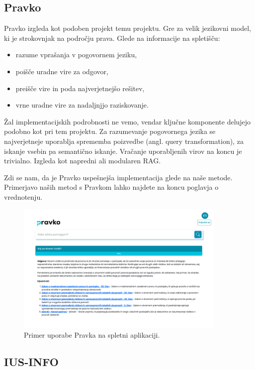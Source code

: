 \documentclass[a4paper,12pt,openright]{book}
\begin{document}
\subsection{Pravko}

Pravko \cite{pravko} izgleda kot podoben projekt temu projektu. Gre za velik jezikovni model, ki je strokovnjak na področju prava. Glede na informacije na spletišču:

\begin{itemize}
    \item razume vprašanja v pogovornem jeziku,
    \item poišče uradne vire za odgovor,
    \item preišče vire in poda najverjetnejšo rešitev,
    \item vrne uradne vire za nadaljnjjo raziskovanje.
\end{itemize}

Žal implementacijskih podrobnosti ne vemo, vendar ključne komponente delujejo podobno kot pri tem projektu. Za razumevanje pogovornega jezika se najverjetneje uporablja sprememba poizvedbe (angl. query transformation), za iskanje vsebin pa semantično iskanje. Vračanje uporabljenih virov na koncu je trivialno. Izgleda kot napredni ali modularen RAG.

Zdi se nam, da je Pravko uspešnejša implementacija glede na naše metode. Primerjavo naših metod s Pravkom lahko najdete na koncu poglavja o vrednotenju.

\begin{figure}[htbp]
    \centering
    \includegraphics[width=0.9\textwidth]{pravko.png}
    \caption{Primer uporabe Pravka na spletni aplikaciji.}
    \label{pravko}
\end{figure}

\subsection{IUS-INFO}
\end{document}
